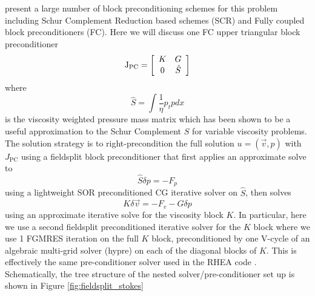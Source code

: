 \cite{may_preconditioned_2008} present a large number of block
preconditioning schemes for this problem including Schur Complement
Reduction based schemes (SCR) and Fully coupled block preconditioners
(FC).  Here we will discuss one FC upper triangular block
preconditioner
\begin{equation}
  \label{eq:ch3-22}
    \mathrm{J}_{\text{PC}} =   \left[
\begin{array}{cc}
  K & G  \\
  0 & \hat{S} \\
  \end{array}
  \right]
\end{equation}
where
\begin{displaymath}
  \hat{S} = \int \frac{1}{\eta} p_{t}p dx
\end{displaymath}
is the viscosity weighted pressure mass matrix which has been shown to
be a useful approximation to the Schur Complement $S$ for variable
viscosity problems\cite{grinevich_iterative_2009,ur_rehman_iterative_2011}.  The solution
strategy is to right-precondition the full solution $u=(\vec{v},p)$
with $J_{\text{PC}}$ using a fieldsplit block preconditioner that
first applies an approximate solve to
\begin{equation}
  \hat{S}\delta p = -F_{p}
\label{eq:ch3-23}
\end{equation}
using a lightweight SOR preconditioned CG iterative solver on
$\hat{S}$, then solves
\begin{equation}
  K\delta\vec{v} = -F_{v} - G\delta p
\label{eq:ch3-24}
\end{equation}
using an approximate iterative solve for the viscosity block $K$. In
particular, here we use a second fieldsplit preconditioned iterative
solver for the $K$ block where we use 1 FGMRES iteration on the full
$K$ block, preconditioned by one V-cycle of  an algebraic multi-grid
solver (hypre) on each of the diagonal blocks of $K$. This is
effectively the same pre-conditioner solver used in the RHEA code
\cite{burstedde_large-scale_2013}. Schematically, the tree structure of the nested solver/pre-conditioner set up is shown in
Figure \ref{fig:fieldsplit_stokes}
